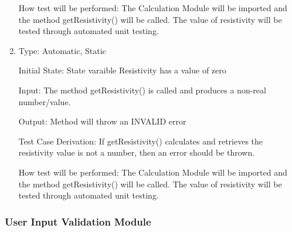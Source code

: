 \documentclass[12pt, titlepage]{article}
\begin{document}
\begin{enumerate}[{UT-C}1.]
  How test will be performed: The Calculation Module will be imported and the method getResistivity() will be called. 
  The value of resistivity will be tested through automated unit testing.
  
  \item
  
  Type: Automatic, Static 

  Initial State: State varaible Resistivity has a value of zero

  Input: The method getResistivity() is called and produces a non-real number/value.

  Output: Method will throw an INVALID error

  Test Case Derivation: If getResistivity() calculates and retrieves the resistivity value is not a number, then an error should be thrown.

  How test will be performed: The Calculation Module will be imported and the method getResistivity() will be called. 
  The value of resistivity will be tested through automated unit testing.
      
  \end{enumerate}


  \subsubsection{User Input Validation Module }
\end{document}
